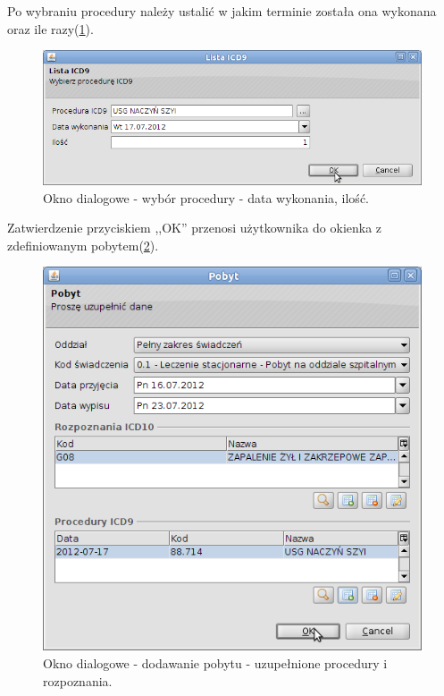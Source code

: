 Po wybraniu procedury należy ustalić w jakim terminie została ona wykonana oraz ile razy(\ref{img:gruper6}).

\begin{figure}%
\centering
\includegraphics[scale=0.4]{images/gruper6}
\caption[Widok grupera]{Okno dialogowe - wybór procedury - data wykonania, ilość.}
\label{img:gruper6}
\end{figure}

Zatwierdzenie przyciskiem ,,OK'' przenosi użytkownika do okienka z zdefiniowanym pobytem(\ref{img:gruper7}).

\begin{figure}%
\centering
\includegraphics[scale=0.4]{images/gruper7}
\caption[Widok grupera]{Okno dialogowe - dodawanie pobytu - uzupełnione procedury i rozpoznania.}
\label{img:gruper7}
\end{figure}

